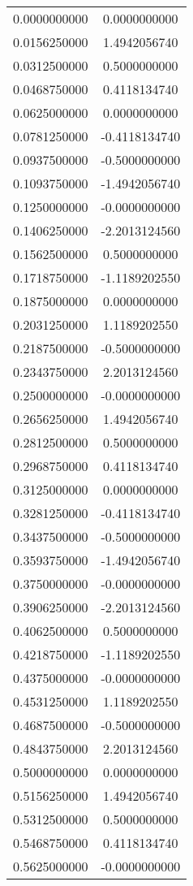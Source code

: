 \begin{longtable}[c]{cc}
0.0000000000 & 0.0000000000 \\
0.0156250000 & 1.4942056740 \\
0.0312500000 & 0.5000000000 \\
0.0468750000 & 0.4118134740 \\
0.0625000000 & 0.0000000000 \\
0.0781250000 & -0.4118134740 \\
0.0937500000 & -0.5000000000 \\
0.1093750000 & -1.4942056740 \\
0.1250000000 & -0.0000000000 \\
0.1406250000 & -2.2013124560 \\
0.1562500000 & 0.5000000000 \\
0.1718750000 & -1.1189202550 \\
0.1875000000 & 0.0000000000 \\
0.2031250000 & 1.1189202550 \\
0.2187500000 & -0.5000000000 \\
0.2343750000 & 2.2013124560 \\
0.2500000000 & -0.0000000000 \\
0.2656250000 & 1.4942056740 \\
0.2812500000 & 0.5000000000 \\
0.2968750000 & 0.4118134740 \\
0.3125000000 & 0.0000000000 \\
0.3281250000 & -0.4118134740 \\
0.3437500000 & -0.5000000000 \\
0.3593750000 & -1.4942056740 \\
0.3750000000 & -0.0000000000 \\
0.3906250000 & -2.2013124560 \\
0.4062500000 & 0.5000000000 \\
0.4218750000 & -1.1189202550 \\
0.4375000000 & -0.0000000000 \\
0.4531250000 & 1.1189202550 \\
0.4687500000 & -0.5000000000 \\
0.4843750000 & 2.2013124560 \\
0.5000000000 & 0.0000000000 \\
0.5156250000 & 1.4942056740 \\
0.5312500000 & 0.5000000000 \\
0.5468750000 & 0.4118134740 \\
0.5625000000 & -0.0000000000 \\

\end{longtable}
